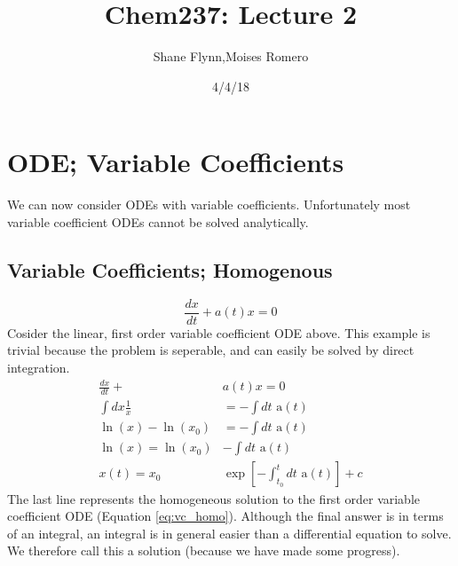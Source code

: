 \documentclass{article}
\title{Chem237: Lecture 2}
\date{4/4/18}
\author{Shane Flynn,Moises Romero}
\newcommand{\be}{\begin{equation}}
\newcommand{\ee}{\end{equation}}
\begin{document}
\maketitle
\section*{ODE; Variable Coefficients}
We can now consider ODEs with variable coefficients.
Unfortunately most variable coefficient ODEs cannot be solved analytically.

\subsection*{Variable Coefficients; Homogenous}
\be \label{eq:vc_homo}
\frac{dx}{dt} + a(t) x = 0
\ee
Cosider the linear, first order variable coefficient ODE above. 
This example is trivial because the problem is seperable, and can easily be solved by direct integration.
\be
\begin{split}
    \frac{dx}{dt} + &a(t) x = 0 \\
    \int dx \frac{1}{x} &= -\int dt \text{ a}(t) \\
    \ln(x) -\ln(x_0)  &= -\int dt \text{ a}(t) \\
    \ln(x)  = \ln(x_0) &-\int dt \text{ a}(t) \\
    x(t) = x_0 &\exp\left[-\int_{t_0}^t dt \text{ a}(t)\right] + c
\end{split}
\ee
The last line represents the homogeneous solution to the first order variable coefficient ODE (Equation \ref{eq:vc_homo}).
Although the final answer is in terms of an integral, an integral is in general easier than a differential equation to solve.
We therefore call this a solution (because we have made some progress).
\end{document}
